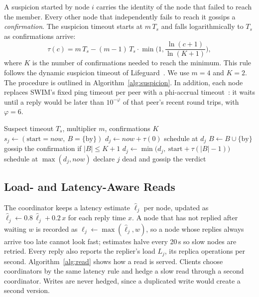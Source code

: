 \documentclass[sigconf,nonacm]{acmart}
\begin{document}
A suspicion started by node $i$ carries the identity of the node that failed to reach the member. Every other node that independently fails to reach it gossips a \emph{confirmation}. The suspicion timeout starts at $m\,T_s$ and falls logarithmically to $T_s$ as confirmations arrive:
\begin{equation}
\tau(c) = m\,T_s - (m-1)\,T_s \cdot \min\!\Big(1, \frac{\ln(c+1)}{\ln(K+1)}\Big),
\end{equation}
where $K$ is the number of confirmations needed to reach the minimum. This rule follows the dynamic suspicion timeout of Lifeguard~\cite{dadgar2018lifeguard}. We use $m=4$ and $K=2$. The procedure is outlined in Algorithm~\ref{alg:suspicion}. In addition, each node replaces SWIM's fixed ping timeout per peer with a phi-accrual timeout~\cite{hayashibara2004phi}: it waits until a reply would be later than $10^{-\varphi}$ of that peer's recent round trips, with $\varphi = 6$.

\begin{algorithm}[t]
\caption{Agreement-Based Suspicion at node $i$}
\label{alg:suspicion}
\begin{algorithmic}[1]
\Require Suspect timeout $T_s$, multiplier $m$, confirmations $K$
    \State $s_j \gets (\text{start} = now,\ B = \{\text{by}\})$
    \State $d_j \gets now + \tau(0)$ 
    \State schedule  at $d_j$
    \State $B \gets B \cup \{\text{by}\}$ 
    \State gossip the confirmation if $|B| \le K+1$
    \State $d_j \gets \min\big(d_j,\ \text{start} + \tau(|B|-1)\big)$
    \State schedule  at $\max(d_j, now)$
  \EndIf
\EndProcedure
{}
    \State declare $j$ dead and gossip the verdict
  \EndIf
\EndProcedure
\end{algorithmic}
\end{algorithm}

\subsection{Load- and Latency-Aware Reads}

The coordinator keeps a latency estimate $\hat{\ell}_j$ per node, updated as $\hat{\ell}_j \gets 0.8\,\hat{\ell}_j + 0.2\,x$ for each reply time $x$. A node that has not replied after waiting $w$ is recorded as $\hat{\ell}_j \gets \max(\hat{\ell}_j, w)$, so a node whose replies always arrive too late cannot look fast; estimates halve every 20\,s so slow nodes are retried. Every reply also reports the replier's load $L_j$, its replica operations per second. Algorithm~\ref{alg:read} shows how a read is served. Clients choose coordinators by the same latency rule and hedge a slow read through a second coordinator. Writes are never hedged, since a duplicated write would create a second version.
\end{document}
